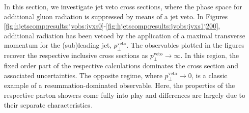 In this section, we investigate jet veto cross sections, where the phase space for
additional gluon radiation is suppressed by means of a jet veto. 
In  Figures 
\ref{fig:hjetscomp:results:jvobs:jvxs0}-\ref{fig:hjetscomp:results:jvobs:jvxs1j200}, 
additional radiation has been vetoed by the application of a maximal transverse 
momentum for the (sub)leading jet, $p_\perp^\text{veto}$. The observables plotted
in the figures recover the respective inclusive cross sections as 
$p_\perp^\text{veto}\to\infty$. In this region, the fixed order 
part of the respective calculations dominates the cross section 
and associated uncertainties. The opposite regime, where $p_\perp^\text{veto}\to 0$, 
is a classic example of a resummation-dominated observable. Here, the 
properties of the respective parton showers come fully into play and 
differences are largely due to their separate characteristics. 

